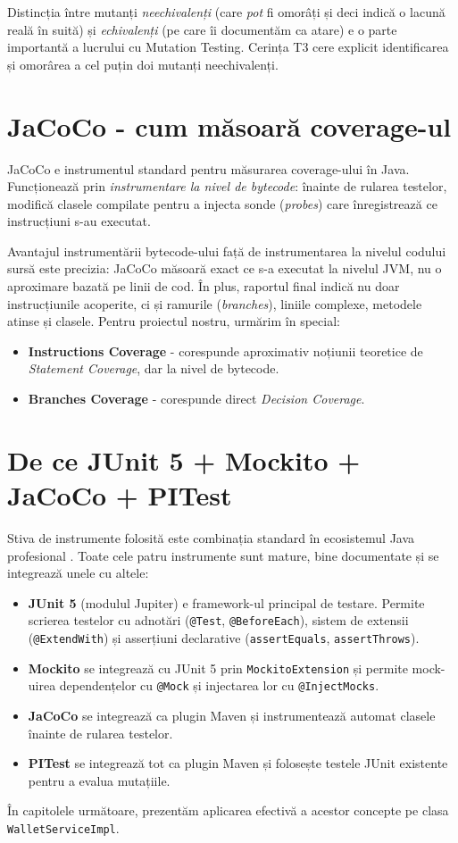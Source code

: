 Distincția între mutanți \textit{neechivalenți} (care \textit{pot} fi omorâți și deci indică o lacună reală în suită) și \textit{echivalenți} (pe care îi documentăm ca atare) e o parte importantă a lucrului cu Mutation Testing. Cerința T3 cere explicit identificarea și omorârea a cel puțin doi mutanți neechivalenți.

\section{JaCoCo - cum măsoară coverage-ul}

JaCoCo \cite{jacoco_docs} e instrumentul standard pentru măsurarea coverage-ului în Java. Funcționează prin \textit{instrumentare la nivel de bytecode}: înainte de rularea testelor, modifică clasele compilate pentru a injecta sonde (\textit{probes}) care înregistrează ce instrucțiuni s-au executat.

Avantajul instrumentării bytecode-ului față de instrumentarea la nivelul codului sursă este precizia: JaCoCo măsoară exact ce s-a executat la nivelul JVM, nu o aproximare bazată pe linii de cod. În plus, raportul final indică nu doar instrucțiunile acoperite, ci și ramurile (\textit{branches}), liniile complexe, metodele atinse și clasele. Pentru proiectul nostru, urmărim în special:

\begin{itemize}
    \item \textbf{Instructions Coverage} - corespunde aproximativ noțiunii teoretice de \textit{Statement Coverage}, dar la nivel de bytecode.
    \item \textbf{Branches Coverage} - corespunde direct \textit{Decision Coverage}.
\end{itemize}

\section{De ce JUnit 5 + Mockito + JaCoCo + PITest}

Stiva de instrumente folosită este combinația standard în ecosistemul Java profesional \cite{junit_docs}. Toate cele patru instrumente sunt mature, bine documentate și se integrează unele cu altele:

\begin{itemize}
    \item \textbf{JUnit 5} (modulul Jupiter) e framework-ul principal de testare. Permite scrierea testelor cu adnotări (\texttt{@Test}, \texttt{@BeforeEach}), sistem de extensii (\texttt{@ExtendWith}) și asserțiuni declarative (\texttt{assertEquals}, \texttt{assertThrows}).
    \item \textbf{Mockito} se integrează cu JUnit 5 prin \texttt{MockitoExtension} și permite mock-uirea dependențelor cu \texttt{@Mock} și injectarea lor cu \texttt{@InjectMocks}.
    \item \textbf{JaCoCo} se integrează ca plugin Maven și instrumentează automat clasele înainte de rularea testelor.
    \item \textbf{PITest} se integrează tot ca plugin Maven și folosește testele JUnit existente pentru a evalua mutațiile.
\end{itemize}

În capitolele următoare, prezentăm aplicarea efectivă a acestor concepte pe clasa \texttt{WalletServiceImpl}.
